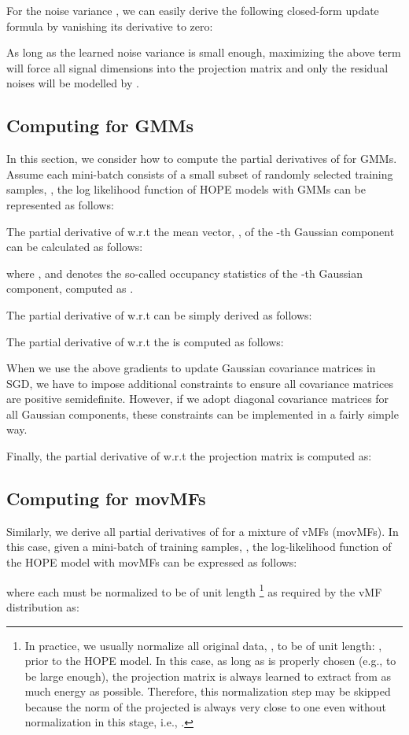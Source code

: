 \documentclass[11pt]{article}
\begin{document}
For the noise variance , we can easily derive the following closed-form update formula by vanishing its derivative to zero:



As long as the learned noise variance  is small enough, maximizing the above term  will force all signal dimensions into the projection matrix  and only the residual noises will be modelled by .

\subsection{Computing  for GMMs}

In this section, we consider how to compute the partial derivatives of   for  GMMs. Assume each mini-batch  consists of a small subset of randomly selected training samples, , the log likelihood function of HOPE models with GMMs can be represented as follows:


The partial derivative of   w.r.t the mean vector, , of the -th Gaussian component can be calculated as follows:
 
where , and  denotes the so-called occupancy statistics of the -th Gaussian component, computed as 
.

The partial derivative of  w.r.t   can be simply derived as follows:


The partial derivative of   w.r.t the  is computed as follows:
 
When we use the above gradients to update Gaussian covariance matrices in SGD, we have to impose additional constraints to ensure all covariance matrices are positive semidefinite. However, if we adopt diagonal covariance matrices for all Gaussian components, these constraints can be implemented in a fairly simple way. 

Finally, the partial derivative of    w.r.t the projection matrix  is computed as:


\subsection{Computing  for movMFs}
\label{subsec-MLE-HOPE-vMF}

Similarly, we derive all partial derivatives of  for a mixture of vMFs (movMFs). In this case, given a mini-batch of training samples, 
,
the log-likelihood function of the HOPE model with movMFs can be expressed as follows:

where each  must be normalized to be of unit length \footnote{In practice, we usually normalize all original data, , to be of unit length: , prior to the HOPE model. In this case, as long as  is properly chosen (e.g., to be large enough), the projection matrix  is always learned to extract from  as much energy as possible. Therefore, this normalization step may be skipped because the norm of the projected  is always very close to one even without normalization in this stage, i.e., .} as required by the vMF distribution as:
\end{document}
